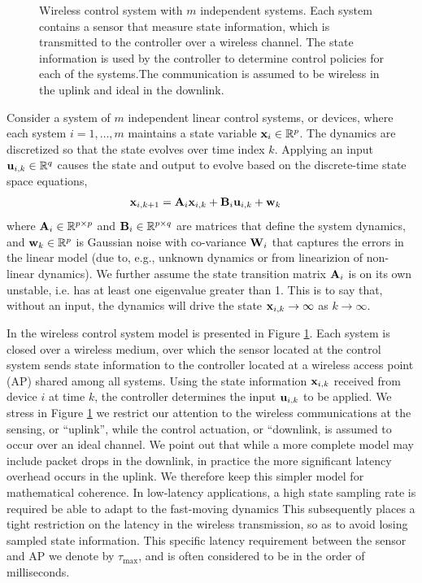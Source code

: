 \begin{figure}
\centering

\caption{Wireless control system with $m$ independent systems. Each system contains a sensor that measure state information, which is transmitted to the controller over a wireless channel. The state information is used by the controller to determine control policies for each of the systems.The communication is assumed to be wireless in the uplink and ideal in the downlink.}
\label{fig_wcs}
\end{figure}


Consider a system of $m$ independent linear control systems, or devices, where each system $i=1,\hdots,m$ maintains a state variable ${\mathbf x}_{i} \in {\mathbb R}^p$. The dynamics are discretized so that the state evolves over time index $k$.  Applying an input ${\mathbf u}_{i,k} \in {\mathbb R}^q$ causes the state and output to evolve based on the discrete-time  state space equations,
%
\begin{align}\label{eq_control_orig}
\bbx_{i,k+1} &= \bbA_{i} \bbx_{i,k} + \bbB_{i} \bbu_{i,k} + \bbw_k
\end{align}
%
where ${\mathbf A}_{i} \in {\mathbb R}^{p \times p}$ and ${\mathbf B}_{i} \in {\mathbb R}^{p \times q}$ are matrices that define the system dynamics, and ${\mathbf w}_{k} \in {\mathbb R}^{p}$ is Gaussian noise with co-variance ${\mathbf W}_i$ that captures the errors in the linear model (due to, e.g., unknown dynamics or from linearizion of non-linear dynamics). We further assume the state transition matrix ${\mathbf A}_i$ is on its own unstable, i.e. has at least one eigenvalue greater than 1. This is to say that, without an input, the dynamics will drive the state ${\mathbf x}_{i,k} \rightarrow \infty$ as $k \rightarrow \infty$.

In the wireless control system model is presented in Figure \ref{fig_wcs}. Each system is closed over a wireless medium, over which the sensor located at the control system sends state information to the controller located at a wireless access point (AP) shared among all systems. Using the state information ${\mathbf x}_{i,k}$ received from device $i$ at time $k$, the controller determines the input $ {\mathbf u}_{i,k}$ to be applied. We stress in Figure \ref{fig_wcs} we restrict our attention to the wireless communications at the sensing, or ``uplink'', while the control actuation, or ``downlink, is assumed to occur over an ideal channel. We point out that while a more complete model may include packet drops in the downlink, in practice the more significant latency overhead occurs in the uplink. We therefore keep this simpler model for mathematical coherence. In low-latency applications, a high state sampling rate is required be able to adapt to the fast-moving dynamics  This subsequently places a tight restriction on the latency in the wireless transmission, so as to avoid losing sampled state information. This specific latency requirement between the sensor and AP we denote by $\tau_{\max}$, and is often considered to be in the order of milliseconds.

